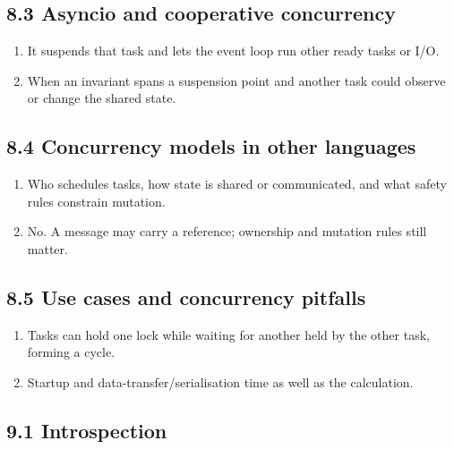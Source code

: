 \documentclass[11pt]{article}
\begin{document}
\begin{keepsection}
\begin{keepsection}
\end{keepsection}
\begin{keepsection}\subsection{8.3 Asyncio and cooperative concurrency}

\begin{enumerate}
\item It suspends that task and lets the event loop run other ready tasks or I/O.
\item When an invariant spans a suspension point and another task could observe or change the shared state.
\end{enumerate}

\end{keepsection}
\begin{keepsection}\subsection{8.4 Concurrency models in other languages}

\begin{enumerate}
\item Who schedules tasks, how state is shared or communicated, and what safety rules constrain mutation.
\item No. A message may carry a reference; ownership and mutation rules still matter.
\end{enumerate}

\end{keepsection}
\begin{keepsection}\subsection{8.5 Use cases and concurrency pitfalls}

\begin{enumerate}
\item Tasks can hold one lock while waiting for another held by the other task, forming a cycle.
\item Startup and data-transfer/serialisation time as well as the calculation.
\end{enumerate}

\end{keepsection}
\begin{keepsection}\subsection{9.1 Introspection}


\end{keepsection}
\end{keepsection}
\end{document}
